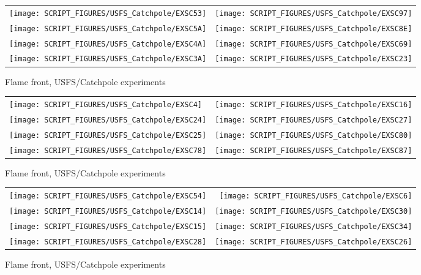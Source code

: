\begin{figure}[p]
\begin{tabular*}{\textwidth}{l@{\extracolsep{\fill}}r}
\texttt{[image: SCRIPT\_FIGURES/USFS\_Catchpole/EXSC53]} &
\texttt{[image: SCRIPT\_FIGURES/USFS\_Catchpole/EXSC97]} \\
\texttt{[image: SCRIPT\_FIGURES/USFS\_Catchpole/EXSC5A]} &
\texttt{[image: SCRIPT\_FIGURES/USFS\_Catchpole/EXSC8E]} \\
\texttt{[image: SCRIPT\_FIGURES/USFS\_Catchpole/EXSC4A]} &
\texttt{[image: SCRIPT\_FIGURES/USFS\_Catchpole/EXSC69]} \\
\texttt{[image: SCRIPT\_FIGURES/USFS\_Catchpole/EXSC3A]} &
\texttt{[image: SCRIPT\_FIGURES/USFS\_Catchpole/EXSC23]} \\
\end{tabular*}
\caption[Flame front, USFS/Catchpole experiments]{Flame front, USFS/Catchpole experiments}
\label{USFS_Catchpole_112}
\end{figure}

\begin{figure}[p]
\begin{tabular*}{\textwidth}{l@{\extracolsep{\fill}}r}
\texttt{[image: SCRIPT\_FIGURES/USFS\_Catchpole/EXSC4]} &
\texttt{[image: SCRIPT\_FIGURES/USFS\_Catchpole/EXSC16]} \\
\texttt{[image: SCRIPT\_FIGURES/USFS\_Catchpole/EXSC24]} &
\texttt{[image: SCRIPT\_FIGURES/USFS\_Catchpole/EXSC27]} \\
\texttt{[image: SCRIPT\_FIGURES/USFS\_Catchpole/EXSC25]} &
\texttt{[image: SCRIPT\_FIGURES/USFS\_Catchpole/EXSC80]} \\
\texttt{[image: SCRIPT\_FIGURES/USFS\_Catchpole/EXSC78]} &
\texttt{[image: SCRIPT\_FIGURES/USFS\_Catchpole/EXSC87]} \\
\end{tabular*}
\caption[Flame front, USFS/Catchpole experiments]{Flame front, USFS/Catchpole experiments}
\label{USFS_Catchpole_120}
\end{figure}

\begin{figure}[p]
\begin{tabular*}{\textwidth}{l@{\extracolsep{\fill}}r}
\texttt{[image: SCRIPT\_FIGURES/USFS\_Catchpole/EXSC54]} &
\texttt{[image: SCRIPT\_FIGURES/USFS\_Catchpole/EXSC6]} \\
\texttt{[image: SCRIPT\_FIGURES/USFS\_Catchpole/EXSC14]} &
\texttt{[image: SCRIPT\_FIGURES/USFS\_Catchpole/EXSC30]} \\
\texttt{[image: SCRIPT\_FIGURES/USFS\_Catchpole/EXSC15]} &
\texttt{[image: SCRIPT\_FIGURES/USFS\_Catchpole/EXSC34]} \\
\texttt{[image: SCRIPT\_FIGURES/USFS\_Catchpole/EXSC28]} &
\texttt{[image: SCRIPT\_FIGURES/USFS\_Catchpole/EXSC26]} \\
\end{tabular*}
\caption[Flame front, USFS/Catchpole experiments]{Flame front, USFS/Catchpole experiments}
\label{USFS_Catchpole_128}
\end{figure}

